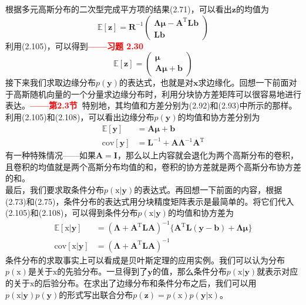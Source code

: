 \documentclass[b5paper]{book}
\numberwithin{equation}{chapter}
\newcommand {\bx} {\boldsymbol{\mathrm{x}}}
\newcommand {\rmT} {\mathrm{T}}
\newcommand {\bfMu} {\boldsymbol{\mu}}
\newcommand {\bfLambda} {\boldsymbol{\Lambda}}
\begin{document}
{\begin{equation}
	\end{equation}
	根据多元高斯分布的二次型完成平方项的结果(2.71)，可以看出$\mathbf{z}$的均值为
	\begin{equation}
		\mathbb{E}[\mathbf{z}]=\mathbf{R}^{-1}\left(\begin{matrix}
			\bfLambda\bfMu-\mathbf{A}^{\rmT}\mathbf{Lb} \\ \mathbf{Lb}
		\end{matrix}\right)
	\end{equation}
	利用(2.105)，可以得到\textcolor{red}{\textbf{——习题 2.30}}
	\begin{equation}
		\mathbb{E}[\mathbf{z}]=\left(\begin{matrix}
			\bfMu \\ \mathbf{A}\bfMu+\mathbf{b}
		\end{matrix}\right)
	\end{equation}
	\indent 接下来我们求取边缘分布$p(\mathbf{y})$的表达式，也就是对$\mathbf{x}$求边缘化。回想一下前面对于高斯随机向量的一个分量求边缘分布时，利用分块协方差矩阵可以很容易地进行表达。\textcolor{red}{\textbf{——第2.3节\ }}特别地，其均值和方差分别为(2.92)和(2.93)中所示的那样。利用(2.105)和(2.108)，可以看出边缘分布$p(\mathbf{y})$的均值和协方差分别为
	\begin{align}
		\mathbb{E}[\mathbf{y}]&=\mathbf{A} \bfMu + \mathbf{b} \\
		\mathrm{cov}[\mathbf{y}]&=\mathbf{L}^{-1}+\mathbf{A}\bfLambda^{-1}\mathbf{A}^{\rmT}
	\end{align}
	有一种特殊情况——如果$\mathbf{A}=\mathbf{I}$，那么以上内容就会退化为两个高斯分布的卷积，且卷积的均值就是两个高斯分布均值的和，卷积的协方差就是两个高斯分布协方差的和。\\
	\indent 最后，我们要求取条件分布$p(\bx|\mathbf{y})$的表达式。再回想一下前面的内容，根据(2.73)和(2.75)，条件分布的表达式用分块精度矩阵表示是最简单的。将它们代入(2.105)和(2.108)，可以得到条件分布$p(\bx|\mathbf{y})$的均值和协方差为
	\begin{align}
		\mathbb{E}[\bx|\mathbf{y}]&=(\bfLambda+\mathbf{A}^{\rmT}\mathbf{LA})^{-1}\{\mathbf{A}^{\rmT}\mathbf{L(y-b)}+\bfLambda\bfMu\} \\
		\mathrm{cov}[\bx|\mathbf{y}]&=(\bfLambda+\mathbf{A}^{\rmT}\mathbf{LA})^{-1}
	\end{align}
	\indent 条件分布的求取事实上可以看成是贝叶斯定理的应用实例。我们可以认为分布$p(\bx)$是关于$\bx$的先验分布。一旦得到了$\mathbf{y}$的值，那么条件分布$p(\bx|\mathbf{y})$就表示对应的关于$\bx$的后验分布。在求出了边缘分布和条件分布之后，我们可以用$p(\bx|\mathbf{y})p(\mathbf{y})$的形式写出联合分布$p(\mathbf{z})=p(\bx)p(\mathbf{y}|\bx)$。\\
}
\end{document}
